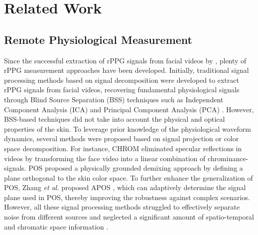 \section{Related Work}
\subsection{Remote Physiological Measurement}
\label{subsec:physiological_measurement}

Since the successful extraction of rPPG signals from facial videos by \cite{VerkruysseGreen2008}, plenty of rPPG measurement approaches have been developed. Initially, traditional signal processing methods based on signal decomposition \cite{PohICA2010} were developed to extract rPPG signals from facial videos, recovering fundamental physiological signals through Blind Source Separation (BSS) techniques such as Independent Component Analysis (ICA) \cite{McDuffANMPM2011,PohICA2010} and Principal Component Analysis (PCA) \cite{LewandowskaPCA2011}. However, BSS-based techniques did not take into account the physical and optical properties of the skin. To leverage prior knowledge of the physiological waveform dynamics, several methods were proposed based on signal projection or color space decomposition. For instance, CHROM \cite{DeCHROM2013} eliminated specular reflections in videos by transforming the face video into a linear combination of chrominance-signals. POS \cite{WangPOS2017} proposed a physically grounded demixing approach by defining a plane orthogonal to the skin color space. To further enhance the generalization of POS, Zhang \textit{et al.} proposed APOS \cite{ZhangAPOS2024}, which can adaptively determine the signal plane used in POS, thereby improving the robustness against complex scenarios. However, all these signal processing methods struggled to effectively separate noise from different sources and neglected a significant amount of spatio-temporal and chromatic space information \cite{McDuffRPPGSURVEY2023}. 


